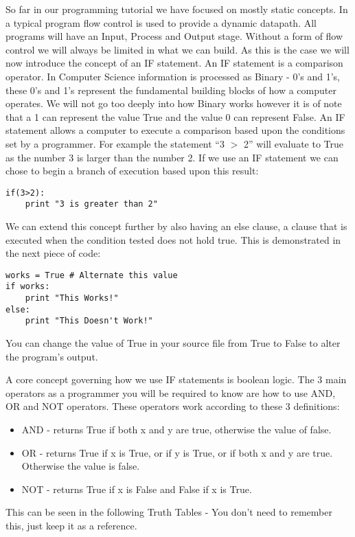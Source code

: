 \documentclass[twocolumn]{article}
\begin{document}
So far in our programming tutorial we have focused on mostly static concepts. In a typical program flow control is used to provide a dynamic datapath. All programs will have an Input, Process and Output stage. Without a form of flow control we will always be limited in what we can build. As this is the case we will now introduce the concept of an IF statement. An IF statement is a comparison operator. In Computer Science information is processed as Binary - 0's and 1's, these 0's and 1's represent the fundamental building blocks of how a computer operates. We will not go too deeply into how Binary works however it is of note that a 1 can represent the value True and the value 0 can represent False. An IF statement allows a computer to execute a comparison based upon the conditions set by a programmer. For example the statement ``3 $>$ 2'' will evaluate to True as the number 3 is larger than the number 2. If we use an IF statement we can chose to begin a branch of execution based upon this result:
\begin{lstlisting}
if(3>2):
	print "3 is greater than 2"
\end{lstlisting}

We can extend this concept further by also having an else clause, a clause that is executed when the condition tested does not hold true. This is demonstrated in the next piece of code:
\begin{lstlisting}
works = True # Alternate this value
if works:
	print "This Works!"
else:
	print "This Doesn't Work!"
\end{lstlisting}
You can change the value of True in your source file from True to False to alter the program's output.

A core concept governing how we use IF statements is boolean logic. The 3 main operators as a programmer you will be required to know are how to use AND, OR and NOT operators. These operators work according to these 3 definitions:
\begin{itemize}
	\item AND - returns True if both x and y are true, otherwise the value of false. 
	\item OR - returns True if x is True, or if y is True, or if both x and y are true. Otherwise the value is false.
	\item NOT - returns True if x is False and False if x is True.
\end{itemize}
This can be seen in the following Truth Tables - You don't need to remember this, just keep it as a reference.
\end{document}
